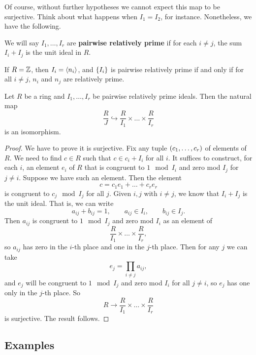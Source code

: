 Of course, without further hypotheses we cannot expect this map to be surjective. Think about what happens when $ I_1 = I_2 $, for instance. Nonetheless, we have the following.

\begin{definition}
We will say $ I_1, \dots, I_r $ are \textbf{pairwise relatively prime} if for each $ i \ne j $, the sum $ I_i + I_j $ is the unit ideal in $ R $.
\end{definition}

If $ R = \mathbb{Z} $, then $ I_i = \left\langle n_i \right\rangle $, and $ \cbr{I_i} $ is pairwise relatively prime if and only if for all $ i \ne j $, $ n_i $ and $ n_j $ are relatively prime.

\begin{theorem}
Let $ R $ be a ring and $ I_1, \dots, I_r $ be pairwise relatively prime ideals. Then the natural map
$$ \dfrac{R}{J} \hookrightarrow \dfrac{R}{I_1} \times \dots \times \dfrac{R}{I_r} $$
is an isomorphism.
\end{theorem}

\begin{proof}
We have to prove it is surjective. Fix any tuple $ \br{c_1, \dots, c_r} $ of elements of $ R $. We need to find $ c \in R $ such that $ c \in c_i + I_i $ for all $ i $. It suffices to construct, for each $ i $, an element $ e_i $ of $ R $ that is congruent to $ 1 \mod I_i $ and zero mod $ I_j $ for $ j \ne i $. Suppose we have such an element. Then the element
$$ c = c_1e_1 + \dots + c_re_r $$
is congruent to $ c_j \mod I_j $ for all $ j $. Given $ i, j $ with $ i \ne j $, we know that $ I_i + I_j $ is the unit ideal. That is, we can write
$$ a_{ij} + b_{ij} = 1, \qquad a_{ij} \in I_i, \qquad b_{ij} \in I_j. $$
Then $ a_{ij} $ is congruent to $ 1 \mod I_j $ and zero mod $ I_i $ as an element of
$$ \dfrac{R}{I_1} \times \dots \times \dfrac{R}{I_r}, $$
so $ a_{ij} $ has zero in the $ i $-th place and one in the $ j $-th place. Then for any $ j $ we can take
$$ e_j = \prod_{i \ne j} a_{ij}, $$
and $ e_j $ will be congruent to $ 1 \mod I_j $ and zero mod $ I_i $ for all $ j \ne i $, so $ e_j $ has one only in the $ j $-th place. So
$$ R \to \dfrac{R}{I_1} \times \dots \times \dfrac{R}{I_r} $$
is surjective. The result follows.
\end{proof}

\pagebreak

\subsection{Examples}


